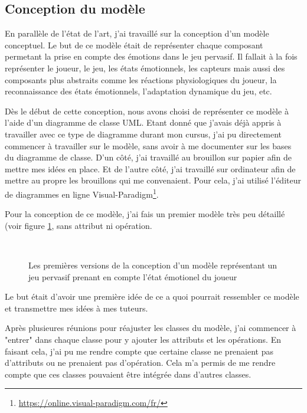 \documentclass{article}
\begin{document}
	\subsection{Conception du modèle}
		En parallèle de l'état de l'art, j'ai travaillé sur la conception d'un modèle conceptuel. 
		Le but de ce modèle était de représenter chaque composant permetant la prise en compte des émotions dans le jeu pervasif. 
		Il fallait à la fois représenter le joueur, le jeu, les états émotionnels, les capteurs mais aussi des composants plus abstraits comme les réactions physiologiques du joueur, la reconnaissance des états émotionnels, l'adaptation dynamique du jeu, etc.\par
		Dès le début de cette conception, nous avons choisi de représenter ce modèle à l'aide d'un diagramme de classe UML. 
		Etant donné que j'avais déjà appris à travailler avec ce type de diagramme durant mon cursus, j'ai pu directement commencer à travailler sur le modèle, sans avoir à me documenter sur les bases du diagramme de classe.
		D'un côté, j'ai travaillé au brouillon sur papier afin de mettre mes idées en place.
		Et de l'autre côté, j'ai travaillé sur ordinateur afin de mettre au propre les brouillons qui me convenaient.
		Pour cela, j'ai utilisé l'éditeur de diagrammes en ligne Visual-Paradigm\footnote{\href{https://online.visual-paradigm.com/fr/}{https://online.visual-paradigm.com/fr/}}.\par
		Pour la conception de ce modèle, j'ai fais un premier modèle très peu détaillé (voir figure \ref{fig:premmodele}, sans attribut ni opération.
		\begin{figure}
			\label{fig:vers1}\\
			\label{fig:vers2}
			\caption{Les premières versions de la conception d'un modèle représentant un jeu pervasif prenant en compte l'état émotionel du joueur}
			\label{fig:premmodele}
		\end{figure}
		Le but était d'avoir une première idée de ce a quoi pourrait ressembler ce modèle et transmettre mes idées à mes tuteurs.\par
		Après plusieures réunions pour réajuster les classes du modèle, j'ai commencer à "entrer" dans chaque classe pour y ajouter les attributs et les opérations. 
		En faisant cela, j'ai pu me rendre compte que certaine classe ne prenaient pas d'attributs ou ne prenaient pas d'opération.
		Cela m'a permis de me rendre compte que ces classes pouvaient être intégrée dans d'autres classes.
\end{document}
